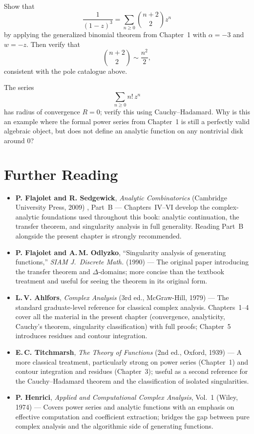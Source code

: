\begin{exercise}
Show that
\[
  \frac{1}{(1-z)^3} = \sum_{n \ge 0} \binom{n+2}{2} z^n
\]
by applying the generalized binomial theorem from Chapter~1 with $\alpha=-3$ and $w=-z$. Then verify that
\[
  \binom{n+2}{2} \sim \frac{n^2}{2},
\]
consistent with the pole catalogue above.
\end{exercise}

\begin{exercise}
The series
\[
  \sum_{n \ge 0} n!\,z^n
\]
has radius of convergence $R=0$; verify this using Cauchy--Hadamard. Why is this an example where the formal power series from Chapter~1 is still a perfectly valid algebraic object, but does not define an analytic function on any nontrivial disk around $0$?
\end{exercise}

\section*{Further Reading}

\begin{itemize}
  \item \textbf{P. Flajolet and R. Sedgewick}, \emph{Analytic Combinatorics} (Cambridge University Press, 2009) \cite{FlajoletSedgewick2009}, Part~B --- Chapters~IV--VI develop the complex-analytic foundations used throughout this book: analytic continuation, the transfer theorem, and singularity analysis in full generality. Reading Part~B alongside the present chapter is strongly recommended.

  \item \textbf{P. Flajolet and A.\,M. Odlyzko}, ``Singularity analysis of generating functions,'' \emph{SIAM J.\ Discrete Math.} (1990) \cite{FlajoletOdlyzko1990} --- The original paper introducing the transfer theorem and $\Delta$-domains; more concise than the textbook treatment and useful for seeing the theorem in its original form.

  \item \textbf{L.\,V. Ahlfors}, \emph{Complex Analysis} (3rd ed., McGraw-Hill, 1979) --- The standard graduate-level reference for classical complex analysis. Chapters~1--4 cover all the material in the present chapter (convergence, analyticity, Cauchy's theorem, singularity classification) with full proofs; Chapter~5 introduces residues and contour integration.

  \item \textbf{E.\,C. Titchmarsh}, \emph{The Theory of Functions} (2nd ed., Oxford, 1939) --- A more classical treatment, particularly strong on power series (Chapter~1) and contour integration and residues (Chapter~3); useful as a second reference for the Cauchy--Hadamard theorem and the classification of isolated singularities.

  \item \textbf{P. Henrici}, \emph{Applied and Computational Complex Analysis}, Vol.~1 (Wiley, 1974) --- Covers power series and analytic functions with an emphasis on effective computation and coefficient extraction; bridges the gap between pure complex analysis and the algorithmic side of generating functions.
\end{itemize}
